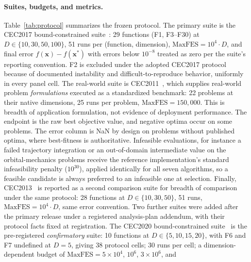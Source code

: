 \paragraph{Suites, budgets, and metrics.}
Table~\ref{tab:protocol} summarizes the frozen protocol. The primary
suite is the CEC2017 bound-constrained suite~\cite{awad2016problem}:
29 functions (F1, F3--F30) at $D \in \{10, 30, 50, 100\}$, 51 runs per
(function, dimension), $\mathrm{MaxFES} = 10^{4} \cdot D$, and final
error $f(\mathbf{x}) - f(\mathbf{x}^{*})$ with errors below $10^{-8}$
treated as zero per the suite's reporting convention. F2 is excluded under the
adopted CEC2017 protocol because of documented instability and
difficult-to-reproduce behavior, uniformly in every panel cell.
The real-world suite is CEC2011~\cite{das2011cec2011}, which supplies
real-world problem \emph{formulations} executed as a standardized benchmark:
22 problems at their native dimensions, 25 runs per problem,
$\mathrm{MaxFES} = 150{,}000$. This is breadth of application formulation,
not evidence of deployment performance. The endpoint is the raw best objective
value, and negative optima occur on some problems. The error column
is NaN by design on problems without published optima, where
best-fitness is authoritative.
Infeasible evaluations, for instance a failed trajectory integration
or an out-of-domain intermediate value on the orbital-mechanics problems
receive the reference implementation's standard infeasibility penalty ($10^{30}$),
applied identically for all seven algorithms, so a feasible candidate is
always preferred to an infeasible one at selection.
Finally, CEC2013~\cite{liang2013cec2013} is reported as a second
comparison suite for breadth of comparison under the same protocol:
28 functions at $D \in \{10, 30, 50\}$, 51 runs,
$\mathrm{MaxFES} = 10^{4} \cdot D$, same error convention.
Two further suites were added after the primary release under a
registered analysis-plan addendum, with their protocol facts fixed at
registration. The CEC2020 bound-constrained suite~\cite{yue2020cec2020}
is the pre-registered \emph{confirmatory} suite: 10 functions at
$D \in \{5, 10, 15, 20\}$, with F6 and F7 undefined at $D = 5$, giving
38 protocol cells; 30 runs per cell; a dimension-dependent budget of
$\mathrm{MaxFES} = 5 \times 10^{4}$, $10^{6}$, $3 \times 10^{6}$, and
